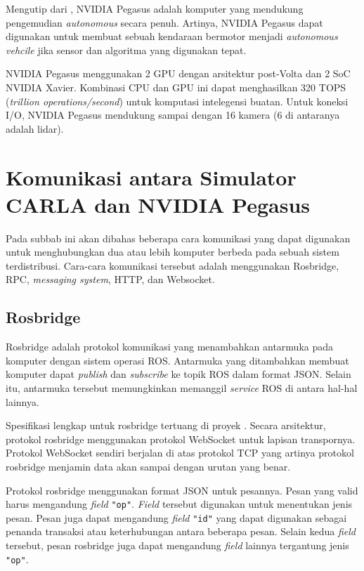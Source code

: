 Mengutip dari \parencite{oh_2017}, NVIDIA Pegasus adalah komputer yang
mendukung pengemudian \textit{autonomous} secara penuh. Artinya, NVIDIA Pegasus
dapat digunakan untuk membuat sebuah kendaraan bermotor menjadi
\textit{autonomous vehcile} jika sensor dan algoritma yang digunakan tepat.

NVIDIA Pegasus menggunakan 2 GPU dengan arsitektur post-Volta dan 2 SoC NVIDIA
Xavier. Kombinasi CPU dan GPU ini dapat menghasilkan 320 TOPS (\textit{trillion
    operations/second}) untuk komputasi intelegensi buatan. Untuk koneksi I/O,
NVIDIA Pegasus mendukung sampai dengan 16 kamera (6 di antaranya adalah lidar).


\section{Komunikasi antara Simulator CARLA dan NVIDIA Pegasus}

Pada subbab ini akan dibahas beberapa cara komunikasi yang dapat digunakan
untuk menghubungkan dua atau lebih komputer berbeda pada sebuah sistem
terdistribusi. Cara-cara komunikasi tersebut adalah menggunakan Rosbridge, RPC,
\textit{messaging system}, HTTP, dan Websocket.

\subsection{Rosbridge}

Rosbridge adalah protokol komunikasi yang menambahkan antarmuka pada komputer
dengan sistem operasi ROS. Antarmuka yang ditambahkan membuat komputer dapat
\textit{publish} dan \textit{subscribe} ke topik ROS dalam format JSON. Selain
itu, antarmuka tersebut memungkinkan memanggil \textit{service} ROS di antara
hal-hal lainnya.

Spesifikasi lengkap untuk rosbridge tertuang di proyek \parencite{ros_bridge}.
Secara arsitektur, protokol rosbridge menggunakan protokol WebSocket untuk
lapisan transpornya. Protokol WebSocket sendiri berjalan di atas protokol TCP
yang artinya protokol rosbridge menjamin data akan sampai dengan urutan yang
benar.

Protokol rosbridge menggunakan format JSON untuk pesannya. Pesan yang valid
harus mengandung \textit{field} \texttt{"op"}. \textit{Field} tersebut
digunakan untuk menentukan jenis pesan. Pesan juga dapat mengandung
\textit{field} \texttt{"id"} yang dapat digunakan sebagai penanda transaksi
atau keterhubungan antara beberapa pesan. Selain kedua \textit{field} tersebut,
pesan rosbridge juga dapat mengandung \textit{field} lainnya tergantung jenis
\texttt{"op"}.

